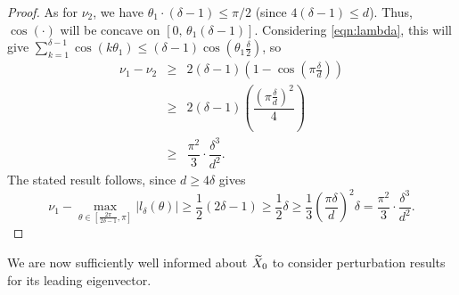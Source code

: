 \begin{proof}
As for $\nu_2$, we have $\theta_1 \cdot (\delta - 1) \le \pi / 2$ (since $4(\delta - 1) \le d$). Thus, $\cos(\cdot)$ will be concave on $[0,\, \theta_1(\delta-1)]$.  Considering \eqref{eqn:lambda}, this will give $\sum_{k=1}^{\delta - 1}\cos(k\theta_1) \le (\delta - 1) \cos \left(\theta_1 \frac{\delta}{2} \right)$, so \[\begin{array}{rcl}
  \nu_1 - \nu_2 & \ge & 2(\delta - 1) \left(1 - \cos \left(\pi\frac{\delta}{d} \right) \right)\\
  & \ge & 2(\delta - 1) \left(\dfrac{(\pi \frac{\delta}{d})^2}{4}\right) \\
  & \ge & \dfrac{\pi^2}{3} \cdot \dfrac{\delta^3}{d^2}.
\end{array}\]
The stated result follows, since $d \ge 4 \delta$ gives \[\nu_1 - \max\limits_{\theta \in [\frac{2\pi}{2\delta-1}, \pi]} |l_\delta(\theta)| \ge \frac{1}{2}(2 \delta - 1) \ge \dfrac{1}{2} \delta \ge \dfrac{1}{3}\left(\dfrac{\pi \delta}{d}\right)^2 \delta = \dfrac{\pi^2}{3} \cdot \dfrac{\delta^3}{d^2}.\]
\end{proof}

We are now sufficiently well informed about $\widetilde{X}_0$ to consider perturbation results for its leading eigenvector.
